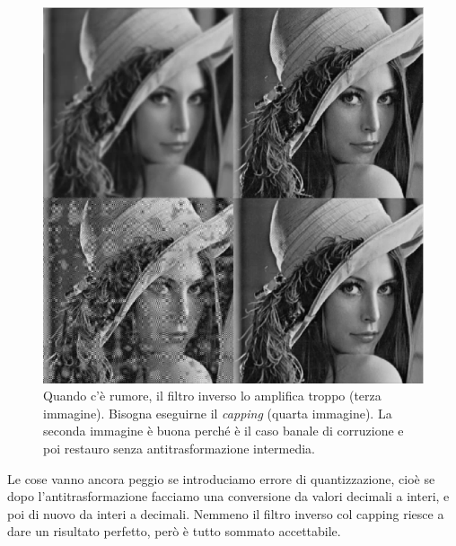 \documentclass[a4paper,11pt]{article}
\begin{document}
\renewcommand{\thefigure}{8.12}
\begin{figure}[!h]
  \centering
    \includegraphics[scale=0.5]{images/8/lena_inversion_with_noise.png}
    \caption{Quando c'è rumore, il filtro inverso lo amplifica troppo (terza immagine). Bisogna eseguirne il \textit{capping} (quarta immagine). La seconda immagine è buona perché è il
    caso banale di corruzione e poi restauro senza antitrasformazione intermedia.}
\end{figure}

\newpage

Le cose vanno ancora peggio se introduciamo errore di quantizzazione, cioè se dopo l'antitrasformazione facciamo una conversione da valori decimali
a interi, e poi di nuovo da interi a decimali. Nemmeno il filtro inverso col capping riesce a dare un risultato perfetto, però è tutto sommato accettabile.
\end{document}
